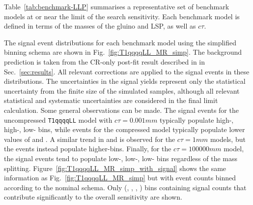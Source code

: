 Table~\ref{tab:benchmark-LLP} summarises a representative set of
benchmark models at or near the limit of the search sensitivity. Each
benchmark model is defined in terms of the masses of the gluino and
LSP, as well as $c\tau$. 

The signal event distributions for each benchmark model using the
simplified binning schema are shown in
Fig.~\ref{fig:T1qqqqLL_MR_simp}. The background prediction is taken
from the CR-only post-fit result described in in
Sec.~\ref{sec:results}. All relevant corrections are applied to the
signal events in these distributions. The uncertainties in the signal
yields represent only the statistical uncertainty from the finite size
of the simulated samples, although all relevant statistical and
systematic uncertainties are considered in the final limit
calculation. Some general observations can be made. The signal events
for the uncompressed \texttt{T1qqqqLL} model with $c\tau =
0.001\unit{mm}$ typically populate high-\njet, high-\mht, low-\nb
bins, while events for the compressed model typically populate lower
values of \njet and \mht. A similar trend in \njet and \mht is
observed for the $c\tau = 1\unit{mm}$ models, but the events instead
populate higher-\nb bins. Finally, for the $c\tau = 100000\unit{mm}$
model, the signal events tend to populate low-\njet, low-\mht, low-\nb
bins regardless of the mass splitting.
Figure~\ref{fig:T1qqqqLL_MR_simp_with_signal} shows the same
information as Fig.~\ref{fig:T1qqqqLL_MR_simp} but with event counts
binned according to the nominal schema. Only (\njet, \nb, \scalht,
\mht) bins containing signal counts that contribute significantly to
the overall sensitivity are shown.

